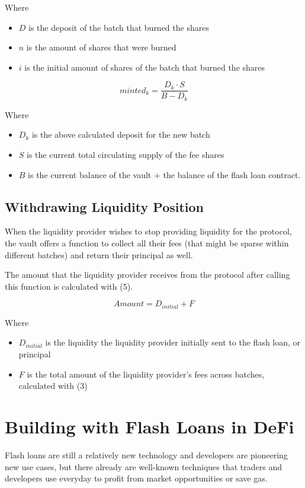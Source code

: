 \documentclass[twocolumn]{article}
\begin{document}
Where
\begin{itemize}
\item \( D \) is the deposit of the batch that burned the shares
\item \( n \) is the amount of shares that were burned
\item \( i \) is the initial amount of shares of the batch that burned the shares
\end{itemize}

\begin{equation}
minted_{k} = \frac{D_{k} \cdot S}{B - D_{k}}
\end{equation}

Where
\begin{itemize}
\item \( D_{k} \) is the above calculated deposit for the new batch
\item \( S \) is the current total circulating supply of the fee shares
\item \( B \) is the current balance of the vault \( + \) the balance of the flash loan contract.
\end{itemize}

\subsection{Withdrawing Liquidity Position}
When the liquidity provider wishes to stop providing liquidity for the protocol, the vault offers a function to collect all their fees (that might be sparse within different batches) and return their principal as well.

The amount that the liquidity provider receives from the protocol after calling this function is calculated with (5).

\begin{equation}
Amount = D_{initial} + F
\end{equation}

Where
\begin{itemize}
\item \( D_{initial} \) is the liquidity the liquidity provider initially sent to the flash loan, or principal
\item \( F \) is the total amount of the liquidity provider's fees across batches, calculated with (3)
\end{itemize}

\vspace{20px}

\section{Building with Flash Loans in DeFi}
Flash loans are still a relatively new technology and developers are pioneering new use cases, but there already are well-known techniques that traders and developers use everyday to profit from market opportunities or save gas.
\end{document}
